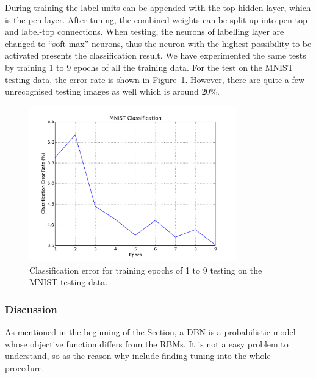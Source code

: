 	During training the label units can be appended with the top hidden layer, which is the pen layer.
	After tuning, the combined weights can be split up into pen-top and label-top connections.
	When testing, the neurons of labelling layer are changed to ``soft-max'' neurons, thus the neuron with the highest possibility to be activated presents the classification result.
	We have experimented the same tests by training 1 to 9 epochs of all the training data.
	For the test on the MNIST testing data, the error rate is shown in Figure~\ref{Fig:class}.
	However, there are quite a few unrecognised testing images as well which is around 20\%.
		\begin{figure}[hbt]
				\centering
				\includegraphics[width=0.8\textwidth]{pics_sdbn/MNISTerror.pdf}
				\caption{Classification error for training epochs of 1 to 9 testing on the MNIST testing data.} 
				\label{Fig:class}
		\end{figure}	
	
	\subsubsection{Discussion}
		As mentioned in the beginning of the Section, a DBN is a probabilistic model whose objective function differs from the RBMs.
		It is not a easy problem to understand, so as the reason why include finding tuning into the whole procedure.
	
	
